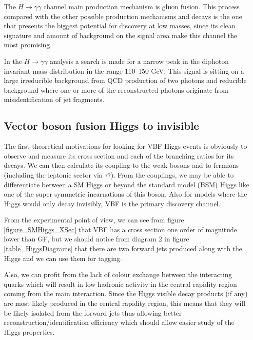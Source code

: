 \documentclass[%
reprint,
amsmath,
amssymb,
aps,
pra,
showkeys
]{revtex4-1}
\begin{document}
The $H \rightarrow \gamma\gamma$ channel main production mechanism is gluon fusion. This process compared with the 
other possible production mechanisms and decays is the one that presents the biggest potential for discovery at low
masses, since its clean signature and amount of background on the signal area make this channel the most promising.

In the $H \rightarrow \gamma\gamma$ analysis a search is made for a narrow peak in the diphoton invariant mass
distribution in the range 110–150 GeV. This signal is sitting on a large irreducible background from QCD production 
of two photons and reducible background where one or more of the reconstructed photons originate from 
misidentification of jet fragments.

\subsection{Vector boson fusion Higgs to invisible}

The first theoretical motivations for looking for VBF Higgs events is obviously to observe and measure its
cross section and each of the branching ratios for its decays. We can then calculate its coupling to the
weak bosons and to fermions (including the leptonic sector via $\tau\bar{\tau}$). From the couplings, we may be able 
to differentiate between a SM Higgs or beyond the standard model (BSM) Higgs like one of the super symmetric
incarnations of this boson\cite{article:Duhrssen:2004cv,article:Zeppenfeld:2000td}. Also for models where the Higgs 
would only decay invisibly, VBF is the primary discovery channel.

From the experimental point of view, we can see from figure \ref{figure_SMHiggs_XSec} that VBF has a cross section
one order of magnitude lower than GF, but we should notice from diagram 2 in figure \ref{table_HiggsDiagrams} that
there are two forward jets produced along with the Higgs and we can use them for tagging. 

Also, we can profit from the lack of colour exchange between the interacting quarks which will result in low 
hadronic activity in the central rapidity region coming from the main interaction. Since the Higgs visible decay 
products (if any) are most likely produced in the central rapidity region, this means that they will be likely 
isolated from the forward jets thus allowing better reconstruction/identification efficiency which should allow 
easier study of the Higgs properties.
\end{document}
